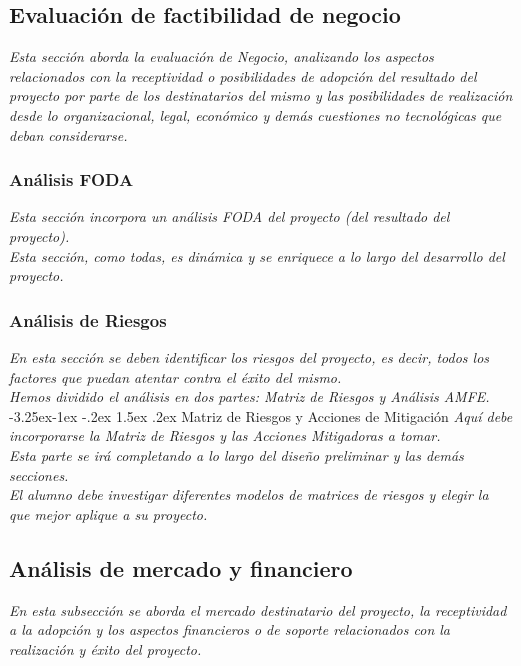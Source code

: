 \documentclass[12pt]{article}
\makeatletter
\renewcommand\paragraph{\@startsection{paragraph}{4}{\z@}%
                                     {-3.25ex\@plus -1ex \@minus -.2ex}%
                                     {1.5ex \@plus .2ex}%
                                     {\normalfont\normalsize\bfseries}}
\makeatother
\begin{document}
\subsection{Evaluación de factibilidad de negocio}
{\it
Esta sección aborda la evaluación de Negocio, analizando los aspectos relacionados con la receptividad o posibilidades de adopción del resultado del proyecto por parte de los destinatarios del mismo y las posibilidades de realización desde lo organizacional, legal, económico y demás cuestiones no tecnológicas que deban considerarse.
}

\subsubsection{Análisis FODA}
{\it
Esta sección incorpora un análisis FODA del proyecto (del resultado del proyecto).\\
Esta sección, como todas, es dinámica y se enriquece a lo largo del desarrollo del proyecto.
}

\subsubsection{Análisis de Riesgos}
{\it
En esta sección se deben identificar los riesgos del proyecto, es decir, todos los factores que puedan atentar contra el éxito del mismo.\\
Hemos dividido el análisis en dos partes: Matriz de Riesgos y Análisis AMFE.
}
    \paragraph{Matriz de Riesgos y Acciones de Mitigación}
    {\it
    Aquí debe incorporarse la Matriz de Riesgos y las Acciones Mitigadoras a tomar.\\
    Esta parte se irá completando a lo largo del diseño preliminar y las demás secciones.\\
    El alumno debe investigar diferentes modelos de matrices de riesgos y elegir la que mejor aplique a su proyecto.
    }

\subsection{Análisis de mercado y financiero}
{\it
En esta subsección se aborda el mercado destinatario del proyecto, la receptividad a la adopción y los aspectos financieros o de soporte relacionados con la realización y éxito del proyecto.
}
\end{document}

